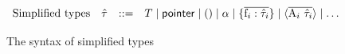 
\begin{figure}
\[
\begin{array}{llclr}
  \text{Simplified types} 
     & \hat{\tau} & ::=  & T \mid \mathsf{pointer} \mid () \mid \alpha \mid
                         \{ \overline{\mathrm{f}_i : \hat{\tau}_i} \} \mid
                         \langle \overline{\mathrm{A}_i\ \hat{\tau}_i} \rangle \mid \dots &
\end{array}
\]
\caption{The syntax of simplified types}
\label{fig:syntax-simplified-types}
\end{figure}
